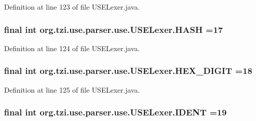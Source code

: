Definition at line 123 of file U\-S\-E\-Lexer.\-java.

\hypertarget{classorg_1_1tzi_1_1use_1_1parser_1_1use_1_1_u_s_e_lexer_a7e2dcfdaf44e42fc25d9c4932201d0d7}{
\subsubsection[{H\-A\-S\-H}]{\setlength{\rightskip}{0pt plus 5cm}final int org.\-tzi.\-use.\-parser.\-use.\-U\-S\-E\-Lexer.\-H\-A\-S\-H =17\hspace{0.3cm}{\ttfamily [static]}}}\label{classorg_1_1tzi_1_1use_1_1parser_1_1use_1_1_u_s_e_lexer_a7e2dcfdaf44e42fc25d9c4932201d0d7}


Definition at line 124 of file U\-S\-E\-Lexer.\-java.

\hypertarget{classorg_1_1tzi_1_1use_1_1parser_1_1use_1_1_u_s_e_lexer_aecf13771ed6ce7d4577bc05acb0d65cc}{
\subsubsection[{H\-E\-X\-\_\-\-D\-I\-G\-I\-T}]{\setlength{\rightskip}{0pt plus 5cm}final int org.\-tzi.\-use.\-parser.\-use.\-U\-S\-E\-Lexer.\-H\-E\-X\-\_\-\-D\-I\-G\-I\-T =18\hspace{0.3cm}{\ttfamily [static]}}}\label{classorg_1_1tzi_1_1use_1_1parser_1_1use_1_1_u_s_e_lexer_aecf13771ed6ce7d4577bc05acb0d65cc}


Definition at line 125 of file U\-S\-E\-Lexer.\-java.

\hypertarget{classorg_1_1tzi_1_1use_1_1parser_1_1use_1_1_u_s_e_lexer_aff72c5313adb10b4d2daf1a75e1512ce}{
\subsubsection[{I\-D\-E\-N\-T}]{\setlength{\rightskip}{0pt plus 5cm}final int org.\-tzi.\-use.\-parser.\-use.\-U\-S\-E\-Lexer.\-I\-D\-E\-N\-T =19\hspace{0.3cm}{\ttfamily [static]}}}\label{classorg_1_1tzi_1_1use_1_1parser_1_1use_1_1_u_s_e_lexer_aff72c5313adb10b4d2daf1a75e1512ce}


